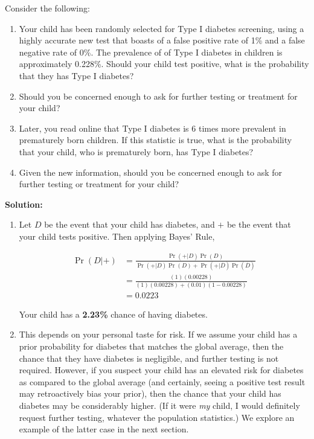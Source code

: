 \documentclass{harvardml}
\theoremstyle{definition}
\theoremstyle{plain}
\begin{document}
\begin{problem}
Consider the following:
\begin{enumerate}[label=(\alph*)]
\item Your child has been randomly selected for Type I diabetes screening, using
a highly accurate new test that boasts of a false positive rate of 1\% and a
false negative rate of 0\%. The prevalence of of Type I diabetes in children is
approximately 0.228\%. Should your child test positive, what is the probability
that they has Type I diabetes?

\item Should you be concerned enough to ask for further testing or treatment for
your child?

\item Later, you read online that Type I diabetes is 6 times more prevalent in
prematurely born children. If this statistic is true, what is the probability
that your child, who is prematurely born, has Type I diabetes?

\item Given the new information, should you be concerned enough to ask for
further testing or treatment for your child?
\end{enumerate}

\textbf{Solution:}
\begin{enumerate}[label=(\alph*)]
\item Let $D$ be the event that your child has diabetes, and $+$ be the event
that your child tests positive. Then applying Bayes' Rule,

\begin{align*}
	\Pr(D | +) &= \frac{\Pr(+ | D) \Pr(D)}{\Pr(+ | D) \Pr(D) + \Pr(+ | \overline{D}) \Pr(\overline{D})} \\
	&= \frac{(1) (0.00228)}{ (1) (0.00228) + (0.01)(1 - 0.00228)} \\
	&= 0.0223
\end{align*}

Your child has a \textbf{2.23\%} chance of having diabetes.

\item This depends on your personal taste for risk. If we assume your child has
a prior probability for diabetes that matches the global average, then the
chance that they have diabetes is negligible, and further testing is not
required. However, if you suspect your child has an elevated risk for diabetes
as compared to the global average (and certainly, seeing a positive test result
may retroactively bias your prior), then the chance that your child has diabetes
may be considerably higher. (If it were \textit{my} child, I would definitely
request further testing, whatever the population statistics.) We explore an
example of the latter case in the next section.


\end{enumerate}
\end{problem}
\end{document}
